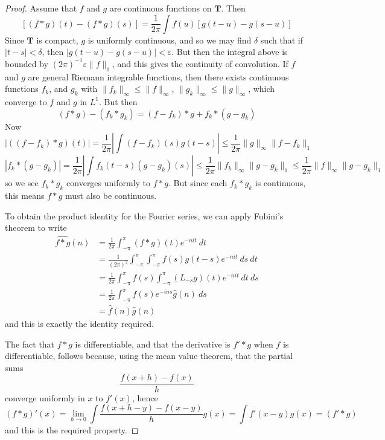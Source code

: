 \begin{proof}
    Assume that $f$ and $g$ are continuous functions on $\mathbf{T}$. Then
    \[ [(f * g)(t) - (f * g)(s)] = \frac{1}{2\pi} \int f(u)[g(t - u) - g(s-u)] \]
    Since $\mathbf{T}$ is compact, $g$ is uniformly continuous, and so we may find $\delta$ such that if $|t - s| < \delta$, then $|g(t-u) - g(s-u)| < \varepsilon$. But then the integral above is bounded by $(2\pi)^{-1} \varepsilon \| f \|_1$, and this gives the continuity of convolution. If $f$ and $g$ are general Riemann integrable functions, then there exists continuous functions $f_k$, and $g_k$ with $\| f_k \|_\infty \leq \| f \|_\infty$, $\| g_k \|_\infty \leq \| g \|_\infty$, which converge to $f$ and $g$ in $L^1$. But then
    \[ (f * g) - (f_k * g_k) = (f - f_k) * g + f_k * (g - g_k) \]
    Now
    \[ |((f - f_k) * g)(t)| = \frac{1}{2\pi} \left| \int (f - f_k)(s) g(t-s) \right| \leq \frac{1}{2\pi} \| g \|_\infty \| f - f_k \|_1 \]
    \[ |f_k * (g - g_k)| = \frac{1}{2\pi} \left| \int f_k(t-s) (g - g_k)(s) \right| \leq \frac{1}{2\pi} \| f_k \|_\infty \| g - g_k \|_1 \leq \frac{1}{2\pi} \| f \|_\infty \| g - g_k \|_1 \]
    so we see $f_k * g_k$ converges uniformly to $f * g$. But since each $f_k * g_k$ is continuous, this means $f * g$ must also be continuous.

    To obtain the product identity for the Fourier series, we can apply Fubini's theorem to write
    \begin{align*}
        \widehat{f * g}(n) &= \frac{1}{2\pi} \int_{-\pi}^\pi (f * g)(t) e^{-nit}\ dt\\
        &= \frac{1}{(2\pi)^2} \int_{-\pi}^\pi \int_{-\pi}^\pi f(s)g(t-s) e^{-nit}\ ds\ dt\\
        &= \frac{1}{2 \pi} \int_{-\pi}^\pi f(s) \int_{-\pi}^\pi (L_{-s}g)(t) e^{-nit}\ dt\ ds\\
        &= \frac{1}{2\pi} \int_{-\pi}^\pi f(s) e^{-ins} \widehat{g}(n)\ ds\\
        &= \widehat{f}(n) \widehat{g}(n)
    \end{align*}
    and this is exactly the identity required.

    The fact that $f * g$ is differentiable, and that the derivative is $f' * g$ when $f$ is differentiable, follows because, using the mean value theorem, that the partial sums
    \[ \frac{f(x + h) - f(x)}{h} \]
    converge uniformly in $x$ to $f'(x)$, hence
    \[ (f * g)'(x) = \lim_{h \to 0} \int \frac{f(x + h - y) - f(x-y)}{h} g(x) = \int f'(x-y) g(x) = (f' * g) \]
    and this is the required property.
\end{proof}

